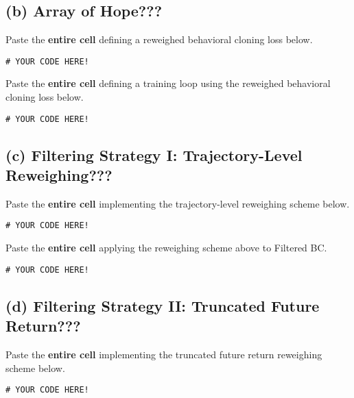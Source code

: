 \documentclass[12pt]{article}
\begin{document}
        \clearpage
        
        \subsection*{(b) Array of Hope???} 
            Paste the \textbf{entire cell} defining a reweighed behavioral cloning loss below.
            \begin{solution}
                \begin{verbatim}
# YOUR CODE HERE!
                \end{verbatim}
            \end{solution}

            \noindent
            Paste the \textbf{entire cell} defining a training loop using the reweighed behavioral cloning loss below.
            \begin{solution}
                \begin{verbatim}
# YOUR CODE HERE!
                \end{verbatim}
            \end{solution}

        \clearpage
            
        \subsection*{(c) Filtering Strategy I: Trajectory-Level Reweighing???} 
            Paste the \textbf{entire cell} implementing the trajectory-level reweighing scheme below.
            \begin{solution}
                \begin{verbatim}
# YOUR CODE HERE!
                \end{verbatim}
            \end{solution}

            \noindent
            Paste the \textbf{entire cell} applying the reweighing scheme above to Filtered BC.
            \begin{solution}
                \begin{verbatim}
# YOUR CODE HERE!
                \end{verbatim}
            \end{solution}

        \clearpage
        
        \subsection*{(d) Filtering Strategy II: Truncated Future Return???} 
            Paste the \textbf{entire cell} implementing the truncated future return reweighing scheme below.
            \begin{solution}
                \begin{verbatim}
# YOUR CODE HERE!
                \end{verbatim}
            \end{solution}
\end{document}

